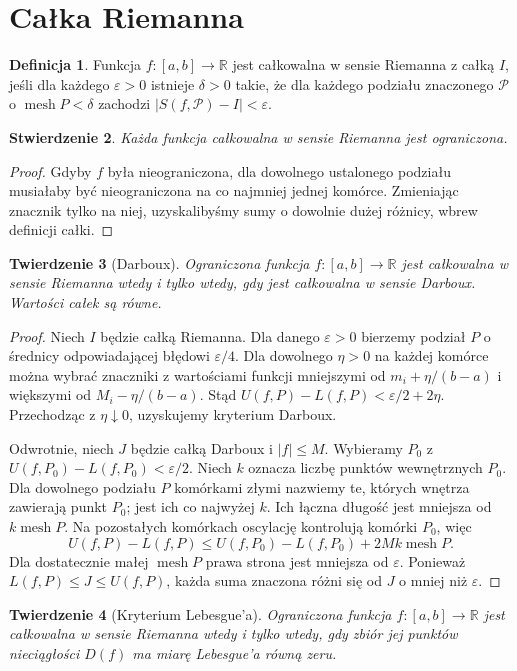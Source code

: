 \documentclass[11pt,a4paper]{article}
\numberwithin{equation}{section}
\theoremstyle{plain}
\newtheorem{twierdzenie}{Twierdzenie}[section]
\newtheorem{stwierdzenie}[twierdzenie]{Stwierdzenie}
\theoremstyle{definition}
\newtheorem{definicja}[twierdzenie]{Definicja}
\theoremstyle{remark}
\newcommand{\R}{\mathbb R}
\newcommand{\mesh}{\operatorname{mesh}}
\begin{document}
\section{Całka Riemanna}
\begin{definicja}
Funkcja $f:[a,b]\to\R$ jest całkowalna w sensie Riemanna z całką $I$, jeśli dla każdego $\varepsilon>0$ istnieje $\delta>0$ takie, że dla każdego podziału znaczonego $\mathcal P$ o $\mesh P<\delta$ zachodzi $|S(f,\mathcal P)-I|<\varepsilon$.
\end{definicja}
\begin{stwierdzenie}
Każda funkcja całkowalna w sensie Riemanna jest ograniczona.
\end{stwierdzenie}
\begin{proof}
Gdyby $f$ była nieograniczona, dla dowolnego ustalonego podziału musiałaby być nieograniczona na co najmniej jednej komórce. Zmieniając znacznik tylko na niej, uzyskalibyśmy sumy o dowolnie dużej różnicy, wbrew definicji całki.
\end{proof}
\begin{twierdzenie}[Darboux]
Ograniczona funkcja $f:[a,b]\to\R$ jest całkowalna w sensie Riemanna wtedy i tylko wtedy, gdy jest całkowalna w sensie Darboux. Wartości całek są równe.
\end{twierdzenie}
\begin{proof}
Niech $I$ będzie całką Riemanna. Dla danego $\varepsilon>0$ bierzemy podział $P$ o średnicy odpowiadającej błędowi $\varepsilon/4$. Dla dowolnego $\eta>0$ na każdej komórce można wybrać znaczniki z wartościami funkcji mniejszymi od $m_i+\eta/(b-a)$ i większymi od $M_i-\eta/(b-a)$. Stąd $U(f,P)-L(f,P)<\varepsilon/2+2\eta$. Przechodząc z $\eta\downarrow0$, uzyskujemy kryterium Darboux.

Odwrotnie, niech $J$ będzie całką Darboux i $|f|\le M$. Wybieramy $P_0$ z $U(f,P_0)-L(f,P_0)<\varepsilon/2$. Niech $k$ oznacza liczbę punktów wewnętrznych $P_0$. Dla dowolnego podziału $P$ komórkami złymi nazwiemy te, których wnętrza zawierają punkt $P_0$; jest ich co najwyżej $k$. Ich łączna długość jest mniejsza od $k\mesh P$. Na pozostałych komórkach oscylację kontrolują komórki $P_0$, więc
\[
U(f,P)-L(f,P)\le U(f,P_0)-L(f,P_0)+2Mk\mesh P.
\]
Dla dostatecznie małej $\mesh P$ prawa strona jest mniejsza od $\varepsilon$. Ponieważ $L(f,P)\le J\le U(f,P)$, każda suma znaczona różni się od $J$ o mniej niż $\varepsilon$.
\end{proof}
\begin{twierdzenie}[Kryterium Lebesgue'a]
Ograniczona funkcja $f:[a,b]\to\R$ jest całkowalna w sensie Riemanna wtedy i tylko wtedy, gdy zbiór jej punktów nieciągłości $D(f)$ ma miarę Lebesgue'a równą zeru.
\end{twierdzenie}
\end{document}
